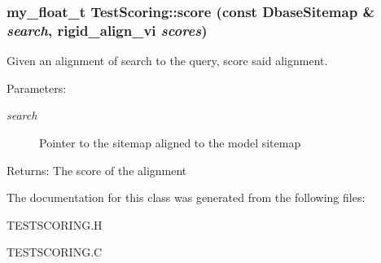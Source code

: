 \subsubsection{\setlength{\rightskip}{0pt plus 5cm}my\_\-float\_\-t Test\-Scoring::score (const \bf{Dbase\-Sitemap} \& {\em search}, rigid\_\-align\_\-vi {\em scores})\hspace{0.3cm}{\tt  [protected]}}\label{classASCbase_1_1TestScoring_e0e06721302874c8daff87995f2609b9}


Given an alignment of search to the query, score said alignment. 

\begin{Desc}
\item[Parameters:]
\begin{description}
\item[{\em search}]Pointer to the sitemap aligned to the model sitemap \end{description}
\end{Desc}
\begin{Desc}
\item[Returns:]The score of the alignment \end{Desc}


The documentation for this class was generated from the following files:\begin{CompactItemize}
\item 
TESTSCORING.H\item 
TESTSCORING.C\end{CompactItemize}
